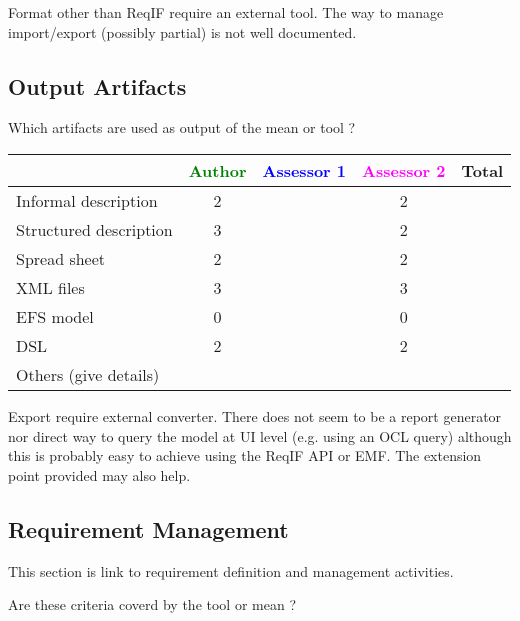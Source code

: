 \begin{assessor2}
Format other than ReqIF require an external tool. The way to manage import/export (possibly partial) is not well documented.
\end{assessor2}

\subsection{Output Artifacts}

Which artifacts are used as output of the mean or tool  ?


\begin{tabular}{|l | c | c | c | c|}
\hline
& \textcolor{green}{Author} & \textcolor{blue}{Assessor 1} & \textcolor{magenta}{Assessor 2} & Total \\
\hline
Informal description & 2 & & 2 &  \\
\hline
Structured description & 3 & & 2 & \\
\hline
Spread sheet & 2 & & 2 & \\
\hline
XML files & 3 & & 3 & \\
\hline
EFS model & 0 & & 0 & \\
\hline
DSL & 2 & & 2 & \\
\hline
Others (give details) & & & & \\
\hline
\end{tabular}

\begin{assessor2}
Export require external converter. There does not seem to be a report generator nor direct way to query the model at UI level (e.g. using an OCL query) although this is probably easy to achieve using the ReqIF API or EMF. The extension point provided may also help.
\end{assessor2}

\subsection{Requirement Management}

This section is link to requirement definition and management activities.

Are these criteria coverd by the tool or mean ?


